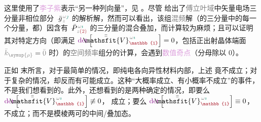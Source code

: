 这里使用了\textcolor{Plum}{李子紫}表示“另一种列向量”，见 。尽管  给出了\textcolor{gray}{傅立叶域}中矢量电场三分量\textcolor{NavyBlue}{非相位部分} $\Xint{{}^{}_{\mathcolor{gray}{-}}}{10}{\bar{g}}^{\;\!\mathcolor{gray}{\omega} \textcolor{PineGreen}{\jmath}}_{\;\! \mathcolor{gray}{z}}$ 的解析解，然而可以看出，该组\textcolor{gray}{混频}解（的三分量中的每一个分量，都）因含有 $\Xint{\mathcolor{gray}{-}}{24}{\bar{P}}^{\;\! \mathcolor{gray}{\omega} \textcolor{PineGreen}{\imath}}_{\;\! \mathcolor{gray}{z} \textcolor{Maroon}{(2)}}$ 的三分量的混合叠加，而计算较为麻烦；且可以证明其对特定方向（即满足 $\textcolor{Plum}{\det} \left[ \Xint{\mathcolor{gray}{-}}{25}{\bar{\bar{\mathsfit{V}}}}^{\;\! \mathcolor{gray}{\omega} \textcolor{PineGreen}{\imath}}_{\textcolor{Maroon}{\mathbb{1}}} \right] = 0$，包括正出射晶体端面 $\mathcolor{gray}{\bar{k}_{\symup{\rho}}} = \mathcolor{gray}{\bar{0}}$ 时）的\textcolor{gray}{空间频率}组分的计算，会遇到\textcolor{Plum}{数值奇点}（分母除以 $0$）。

正如  末所言，对于最简单的情况，即\textcolor{PineGreen}{纯电各向异性}材料内部，上述  竟不成立；对于复杂的情况，却反而有可能成立。这种“大概率成立、有小概率不成立”的事件，不是我们想看到的。此外，还想看到的是两种确定的情况，即要么 $\textcolor{Plum}{\det} \left[ \Xint{\mathcolor{gray}{-}}{25}{\bar{\bar{\mathsfit{V}}}}^{\;\! \mathcolor{gray}{\omega} \textcolor{PineGreen}{\imath}}_{\textcolor{Maroon}{\mathbb{1}}} \right] \not\equiv 0$， 成立；要么 $\textcolor{Plum}{\det} \left[ \Xint{\mathcolor{gray}{-}}{25}{\bar{\bar{\mathsfit{V}}}}^{\;\! \mathcolor{gray}{\omega} \textcolor{PineGreen}{\imath}}_{\textcolor{Maroon}{\mathbb{1}}} \right] \equiv 0$， 不成立；而不是模棱两可的中间/叠加态。

